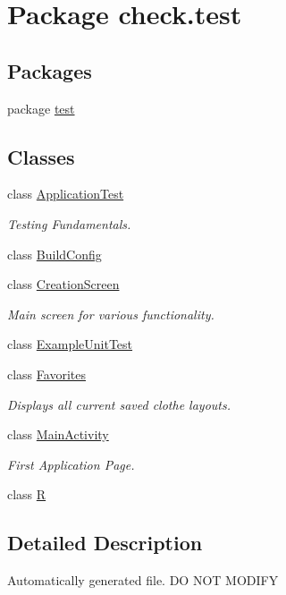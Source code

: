 \hypertarget{namespacecheck_1_1test}{}\section{Package check.\+test}
\label{namespacecheck_1_1test}
\subsection*{Packages}
\begin{DoxyCompactItemize}
\item 
package \hyperlink{namespacecheck_1_1test_1_1test}{test}
\end{DoxyCompactItemize}
\subsection*{Classes}
\begin{DoxyCompactItemize}
\item 
class \hyperlink{classcheck_1_1test_1_1_application_test}{Application\+Test}
\begin{DoxyCompactList}\small\item\em Testing Fundamentals. \end{DoxyCompactList}\item 
class \hyperlink{classcheck_1_1test_1_1_build_config}{Build\+Config}
\item 
class \hyperlink{classcheck_1_1test_1_1_creation_screen}{Creation\+Screen}
\begin{DoxyCompactList}\small\item\em Main screen for various functionality. \end{DoxyCompactList}\item 
class \hyperlink{classcheck_1_1test_1_1_example_unit_test}{Example\+Unit\+Test}
\item 
class \hyperlink{classcheck_1_1test_1_1_favorites}{Favorites}
\begin{DoxyCompactList}\small\item\em Displays all current saved clothe layouts. \end{DoxyCompactList}\item 
class \hyperlink{classcheck_1_1test_1_1_main_activity}{Main\+Activity}
\begin{DoxyCompactList}\small\item\em First Application Page. \end{DoxyCompactList}\item 
class \hyperlink{classcheck_1_1test_1_1_r}{R}
\end{DoxyCompactItemize}


\subsection{Detailed Description}
Automatically generated file. D\+O N\+O\+T M\+O\+D\+I\+F\+Y 